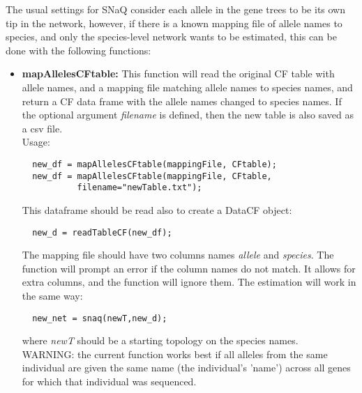 \documentclass[12pt]{article}
\begin{document}
The usual settings for SNaQ consider each allele in the gene trees to
be its own tip in the network, however, if there is a known mapping
file of allele names to species, and only the species-level network
wants to be estimated, this can be done with the following functions:
\begin{itemize}
\item{\textbf{mapAllelesCFtable:} This function will read the original
  CF table with allele names, and a mapping file matching allele names
to species names, and return a CF data frame with the allele names
changed to species names. If the optional argument \textit{filename} is defined,
then the new table is also saved as a csv file.
\\Usage:
\begin{lstlisting}
  new_df = mapAllelesCFtable(mappingFile, CFtable);
  new_df = mapAllelesCFtable(mappingFile, CFtable,
           filename="newTable.txt");
\end{lstlisting}
This dataframe should be read also to create a DataCF object:
\begin{lstlisting}
  new_d = readTableCF(new_df);
\end{lstlisting}
The mapping file should have two columns names \textit{allele} and
\textit{species}. The function will prompt an error if the column
names do not match. It allows for extra columns, and the function will
ignore them.
The estimation will work in the same way:
\begin{lstlisting}
  new_net = snaq(newT,new_d);
\end{lstlisting}
where \textit{newT} should be a starting topology on the species
names.  \\WARNING: the current function works best if all alleles from
the same individual are given the same name (the individual's 'name')
across all genes for which that individual was sequenced.

}
\end{itemize}
\end{document}
